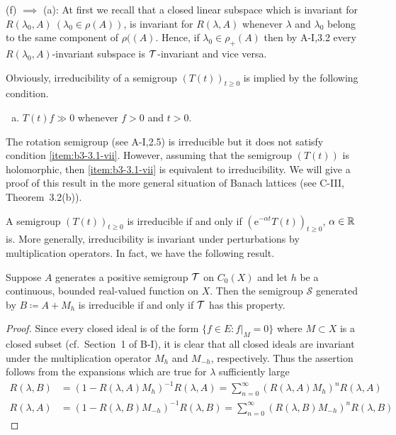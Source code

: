 (f) $\implies$ (a): At first we recall that a closed linear subspace which is invariant for $R(\lambda_0,A)\ (\lambda_0 \in \rho(A))$, is invariant for $R(\lambda ,A)$
whenever $\lambda$ and $\lambda_0$ belong to the same component of $\rho((A)$. 
Hence, if $\lambda_0 \in \rho_{+}(A)$ then by A-I,3.2 every $R(\lambda_0,A)$-invariant subspace is 
$\mathcal{T}$-invariant and vice versa.
\begin{remark}\label{rem:b3-3.2}
	Obviously, irreducibility of a semigroup $(T(t))_{t\geq 0}$ is implied by the following condition.
\begin{enumerate}[(g)]	
\item\label{item:b3-3.1-vii}
$T(t)f \gg 0$ whenever $f > 0$ and $t > 0$.
\end{enumerate}
The rotation semigroup (see A-I,2.5) is irreducible but it does not satisfy condition \ref{item:b3-3.1-vii}.
	However, assuming that the semigroup $(T(t))$ is holomorphic, then \ref{item:b3-3.1-vii}
	is equivalent to irreducibility.
	We will give a proof of this result in the more general situation of Banach lattices (see C-III, Theorem~3.2(b)).
\end{remark}
A semigroup $(T(t))_{t \ge 0}$ is irreducible if and only if $(\mathrm{e}^{-\alpha t}T(t))_{t \ge 0}$, $\alpha \in \mathbb{R}$  is. 
More generally, irreducibility is invariant under perturbations by multiplication operators. 
In fact, we have the following result. 
\begin{proposition}\label{prop:b3-3.3}
%
	Suppose $A$ generates a positive semigroup $\mathcal{T}$ on $C_{0}(X)$ and let $h$ be a continuous, bounded real-valued function on $X$.
	Then the semigroup $\mathcal{S}$ generated by $B \coloneqq A + M_{h}$ is irreducible if and only if\/ $\mathcal{T}$ has this property.
\end{proposition}
\begin{proof}
	Since every closed ideal is of the form $\{f \in E : f|_{M} = 0\}$ where $M \subset X$ is a closed subset (cf.\ Section~1 of B-I), it is clear that all closed ideals are invariant under the multiplication operator $M_{h}$ and $M_{-h}$, respectively.
	Thus the assertion follows from the expansions which are true for $\lambda$ sufficiently large
\begin{align*}
R(\lambda,B) &= (1 - R(\lambda,A)M_{h})^{-1}R(\lambda,A) 
	= \sum_{n=0}^{\infty} (R(\lambda,A)M_{h})^{n}R(\lambda,A) \\
R(\lambda,A) &= (1 - R(\lambda,B)M_{-h})^{-1}R(\lambda,B) = \sum_{n=0}^{\infty} (R(\lambda,B)M_{-h})^{n}R(\lambda,B)
\end{align*} 
\end{proof}
